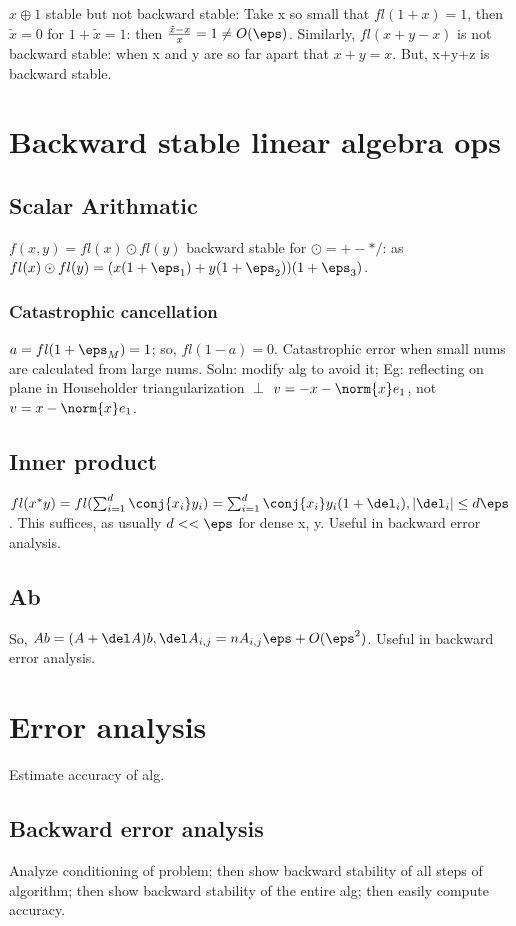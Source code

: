 \documentclass[oneside, article]{memoir}
\begin{document}
$x \oplus 1$ stable but not backward stable: Take x so small that $fl(1+x) = 1$, then $\tilde{x} = 0$ for $1+\tilde{x} = 1$: then $\frac{\tilde{x} - x}{x} = 1 \neq O(\eps)$. Similarly, $fl(x+y-x)$ is not backward stable: when x and y are so far apart that $x+y = x$. But, x+y+z is backward stable.

\section{Backward stable linear algebra ops}
\subsection{Scalar Arithmatic}
$f(x,y) = fl(x) \odot fl(y)$ backward stable for $\odot = + - * /$: as $fl(x) \odot fl(y) = (x(1+\eps_{1}) + y(1+\eps_{2}))(1+\eps_{3})$.

\subsubsection{Catastrophic cancellation}
$a = fl(1 + \eps_{M}) = 1$; so, $fl(1 - a) = 0$. Catastrophic error when small nums are calculated from large nums. Soln: modify alg to avoid it; Eg: reflecting on plane in Householder triangularization $\perp$ $v = -x -\norm{x}e_{1}$, not $v = x -\norm{x}e_{1}$.

\subsection{Inner product}
$fl(x^{*}y) = fl(\sum_{i=1}^{d}\conj{x_{i}}y_{i}) = \sum_{i=1}^{d}\conj{x_{i}}y_{i} (1+\del_{i}), |\del_{i}| \leq d\eps$. This suffices, as usually $d << \eps$ for dense x, y. Useful in backward error analysis.

\subsection{Ab}
So, $Ab = (A+\del A)b, \del A_{i,j} = nA_{i,j} \eps + O(\eps^{2})$. Useful in backward error analysis.

\section{Error analysis}
Estimate accuracy of alg.

\subsection{Backward error analysis}
Analyze conditioning of problem; then show backward stability of all steps of algorithm; then show backward stability of the entire alg; then easily compute accuracy.
\end{document}
